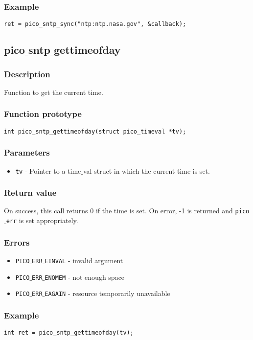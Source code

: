 \subsubsection*{Example}
\begin{verbatim}
ret = pico_sntp_sync("ntp:ntp.nasa.gov", &callback);
\end{verbatim}



\subsection{pico$\_$sntp$\_$gettimeofday}

\subsubsection*{Description}
Function to get the current time.

\subsubsection*{Function prototype}
\begin{verbatim}
int pico_sntp_gettimeofday(struct pico_timeval *tv);
\end{verbatim}

\subsubsection*{Parameters}
\begin{itemize}[noitemsep]
\item \texttt{tv} - Pointer to a time$\_$val struct in which the current time is set.
\end{itemize}

\subsubsection*{Return value}
On success, this call returns 0 if the time is set.
On error, -1 is returned and \texttt{pico$\_$err} is set appropriately.

\subsubsection*{Errors}
\begin{itemize}[noitemsep]
\item \texttt{PICO$\_$ERR$\_$EINVAL} - invalid argument
\item \texttt{PICO$\_$ERR$\_$ENOMEM} - not enough space
\item \texttt{PICO$\_$ERR$\_$EAGAIN} - resource temporarily unavailable
\end{itemize}

\subsubsection*{Example}
\begin{verbatim}
int ret = pico_sntp_gettimeofday(tv);
\end{verbatim}



